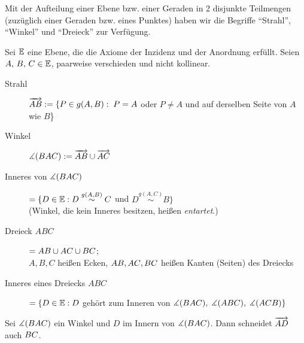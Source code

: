 Mit der Aufteilung einer Ebene bzw. einer Geraden in 2 disjunkte Teilmengen (zuzüglich einer Geraden
bzw. eines Punktes) haben wir die Begriffe "`Strahl"', "`Winkel"' und "`Dreieck"' zur Verfügung.

\begin{defi}
    Sei $\mathbb E$ eine Ebene, die die Axiome der Inzidenz und der Anordnung erfüllt. Seien $A,\, B,\, C
    \in \mathbb E$, paarweise verschieden und nicht kollinear.
    \begin{description}
        \item[Strahl] $\mbox{${\overrightarrow{AB}}$} := \{P \in g(A,B):\; P = A$ oder $P \neq A$ und auf derselben Seite
            von $A$ wie $B$\}

        \item[Winkel] $\mbox{$\measuredangle$}(BAC) := \mbox{${\overrightarrow{AB}}$} \cup \mbox{${\overrightarrow{AC}}$}$

        \item[Inneres von $\mbox{$\measuredangle$}(BAC)$] $= \{D\in\mathbb E: D\stackrel{g(A,B)}{\sim} C$ und $D
            \stackrel{g(A,C)}{\sim} B\}$\\
            (Winkel, die kein Inneres besitzen, heißen \emph{entartet}.)

         \item[Dreieck $ABC$] $= {AB} \cup {AC} \cup {BC}$;\\
             $A, B, C$ heißen Ecken, ${AB}, {AC}, {BC}$ heißen Kanten (Seiten) des
             Dreiecks

        \item[Inneres eines Dreiecks $ABC$] $= \{ D \in \mathbb E : D$ gehört zum Inneren von $\mbox{$\measuredangle$}(BAC),\;
            \mbox{$\measuredangle$}(ABC),\; \mbox{$\measuredangle$}(ACB)\}$

    \end{description}
\end{defi}


\begin{thm}\label{thm:satz.s1c}
    Sei $\mbox{$\measuredangle$}(BAC)$ ein Winkel und $D$ im Innern von $\mbox{$\measuredangle$}(BAC)$. Dann schneidet $\mbox{${\overrightarrow{AD}}$}$ auch
    ${BC}$.
\end{thm}

